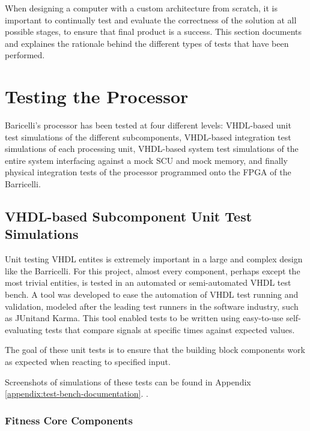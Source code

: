 When designing a computer with a custom architecture from scratch, it is important to continually test and evaluate the correctness of the solution at all possible stages, to ensure that final product is a success.
This section documents and explaines the rationale behind the different types of tests that have been performed.

\section{Testing the Processor}

Baricelli's processor has been tested at four different levels: \gls{VHDL}-based unit test simulations of the different subcomponents,  \gls{VHDL}-based integration test simulations of each processing unit, \gls{VHDL}-based system test simulations of the entire system interfacing against a mock SCU and mock memory, and finally physical integration tests of the processor programmed onto the FPGA of the Barricelli.


\subsection{\gls{VHDL}-based Subcomponent Unit Test Simulations}

Unit testing VHDL entites is extremely important in a large and complex design like the Barricelli.
For this project, almost every component, perhaps except the most trivial entities, is tested in an automated or semi-automated VHDL test bench.
A tool was developed to ease the automation of VHDL test running and validation, modeled after the leading test runners in the software industry, such as JUnit\cn and Karma\cn.
This tool enabled tests to be written using easy-to-use self-evaluating tests that compare signals at specific times against expected values.

The goal of these unit tests is to ensure that the building block components work as expected when reacting to specified input.

Screenshots of simulations of these tests can be found in Appendix \ref{appendix:test-bench-documentation}.
.

\subsubsection{Fitness Core Components}

